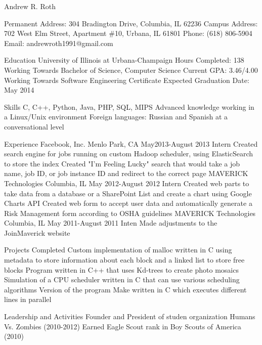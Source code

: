 \documentclass[11pt]{article}
\begin{document}
  Andrew R. Roth

  Permanent Address: 304 Bradington Drive, Columbia, IL 62236
  Campus Address: 702 West Elm Street, Apartment \#10, Urbana, IL 61801
  Phone: (618) 806-5904
  Email: andrewroth1991@gmail.com

  Education
  University of Illinois at Urbana-Champaign
  Hours Completed: 138
  Working Towards Bachelor of Science, Computer Science
  Current GPA: 3.46/4.00
  Working Towards Software Engineering Certificate
  Expected Graduation Date: May 2014

  Skills
  C, C++, Python, Java, PHP, SQL, MIPS
  Advanced knowledge working in a Linux/Unix environment
  Foreign languages: Russian and Spanish at a conversational level

  Experience
  Facebook, Inc.
  Menlo Park, CA
  May2013-August 2013
  Intern
  Created search engine for jobs running on custom Hadoop scheduler, using ElasticSearch to store the index
  Created "I'm Feeling Lucky" search that would take a job name, job ID, or job instance ID and redirect to the correct page
  MAVERICK Technologies
  Columbia, IL
  May 2012-August 2012
  Intern
  Created web parts to take data from a database or a SharePoint List and create a chart using Google Charts API
  Created web form to accept user data and automatically generate a Risk Management form according to OSHA guidelines
  MAVERICK Technologies
  Columbia, IL
  May 2011-August 2011
  Inten
  Made adjustments to the JoinMaverick website

  Projects Completed
  Custom implementation of malloc written in C using metadata to store information about each block and a linked list to store free blocks
  Program written in C++ that uses Kd-trees to create photo mosaics
  Simulation of a CPU scheduler written in C that can use various scheduling algorithms
  Version of the program Make written in C which executes different lines in parallel

  Leadership and Activities
  Founder and President of studen organization Humans Vs. Zombies (2010-2012)
  Earned Eagle Scout rank in Boy Scouts of America (2010)
\end{document}
